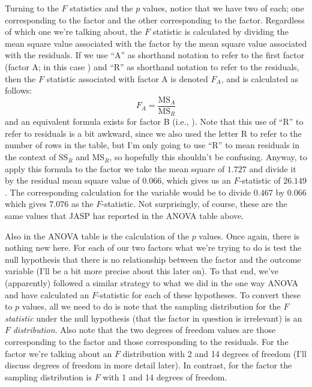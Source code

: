 Turning to the $F$ statistics and the $p$ values, notice that we have two of each; one corresponding to the  factor and the other corresponding to the  factor. Regardless of which one we're talking about, the $F$ statistic is calculated by dividing the mean square value associated with the factor by the mean square value associated with the residuals. If we use ``A'' as shorthand notation to refer to the first factor (factor A; in this case ) and ``R'' as shorthand notation to refer to the residuals, then the $F$ statistic associated with factor A is denoted $F_A$, and is calculated as follows:
$$
F_{A} = \frac{\mbox{MS}_{A}}{\mbox{MS}_{R}}
$$
and an equivalent formula exists for factor B (i.e., ). Note that this use of ``R'' to refer to residuals is a bit awkward, since we also used the letter R to refer to the number of rows in the table, but I'm only going to use ``R'' to mean residuals in the context of SS$_R$ and MS$_R$, so hopefully this shouldn't be confusing. Anyway, to apply this formula to the   factor we take the mean square of $1.727$ and divide it by the residual mean square value of $0.066$, which gives us an $F$-statistic of $26.149$. The corresponding calculation for the  variable would be to divide $0.467$ by $0.066$ which gives $7.076$ as the $F$-statistic. Not surprisingly, of course, these are the same values that JASP has reported in the ANOVA table above.

Also in the ANOVA table is the calculation of the $p$ values. Once again, there is nothing new here. For each of our two factors what we're trying to do is test the null hypothesis that there is no relationship between the factor and the outcome variable (I'll be a bit more precise about this later on). To that end, we've (apparently) followed a similar strategy to what we did in the one way ANOVA and have calculated an $F$-statistic for each of these hypotheses. To convert these to $p$ values, all we need to do is note that the sampling distribution for the $F$ {\it statistic} under the null hypothesis (that the factor in question is irrelevant) is an $F$ {\it distribution}. Also note that the two degrees of freedom values are those corresponding to the factor and those corresponding to the residuals. For the  factor we're talking about an $F$ distribution with 2 and 14 degrees of freedom (I'll discuss degrees of freedom in more detail later). In contrast, for the  factor the sampling distribution is $F$ with 1 and 14 degrees of freedom. 

